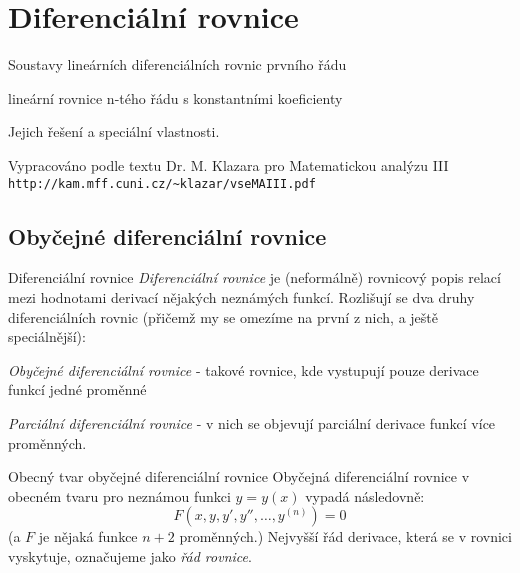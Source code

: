 \def\Real{\mathbb{R}}
\def\COne{\mathcal{C}^1}
\def\F{\mathcal{F}}
\def\e{\mathrm{e}}
\def\Nat{\mathbb{N}}
\def\Complex{\mathbb{C}}
\def\d{\mathrm{d}}

\section{Diferenciální rovnice}

\begin{pozadavky}
\begin{pitemize}
	\item Soustavy lineárních diferenciálních rovnic prvního řádu
	\item lineární rovnice n-tého řádu s konstantními koeficienty 
	\item Jejich řešení a speciální vlastnosti.
\end{pitemize}
\end{pozadavky}

\begin{center}
Vypracováno podle textu Dr. M. Klazara pro Matematickou analýzu III\\
\texttt{http://kam.mff.cuni.cz/\~{}klazar/vseMAIII.pdf}
\end{center}

\subsection{Obyčejné diferenciální rovnice}

\begin{definiceN}{Diferenciální rovnice}
\emph{Diferenciální rovnice} je (neformálně) rovnicový popis relací mezi hodnotami derivací nějakých neznámých funkcí. Rozlišují se dva druhy diferenciálních rovnic (přičemž my se omezíme na první z nich, a ještě speciálnější):
\begin{pitemize}
    \item \emph{Obyčejné diferenciální rovnice} - takové rovnice, kde vystupují pouze derivace funkcí jedné proměnné
    \item \emph{Parciální diferenciální rovnice} - v nich se objevují parciální derivace funkcí více proměnných.
\end{pitemize}
\end{definiceN}

\begin{definiceN}{Obecný tvar obyčejné diferenciální rovnice}
Obyčejná diferenciální rovnice v obecném tvaru pro neznámou funkci $y=y(x)$ vypadá následovně:
$$F(x,y,y',y'',\dots,y^{(n)})=0$$
(a $F$ je nějaká funkce $n+2$ proměnných.) Nejvyšší řád derivace, která se v rovnici vyskytuje, označujeme jako \emph{řád rovnice}.
\end{definiceN}


